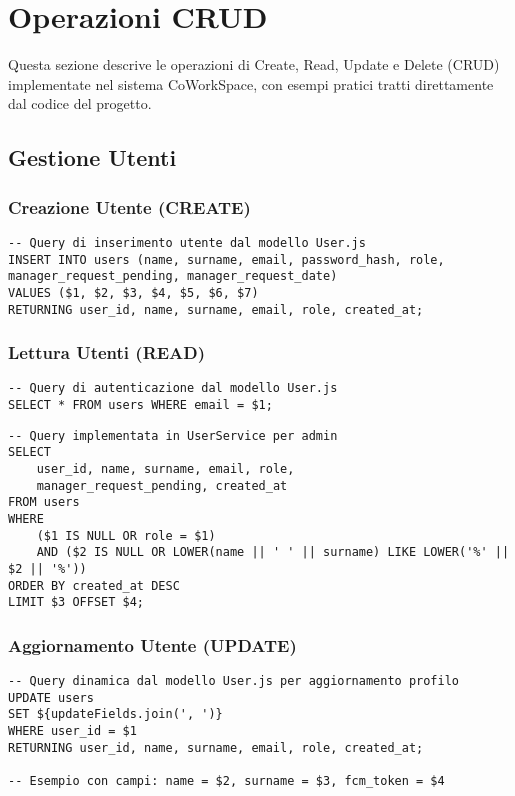 \section{Operazioni CRUD}

Questa sezione descrive le operazioni di Create, Read, Update e Delete (CRUD) implementate nel sistema CoWorkSpace, con esempi pratici tratti direttamente dal codice del progetto.

\subsection{Gestione Utenti}

\subsubsection{Creazione Utente (CREATE)}
\begin{lstlisting}[caption=Registrazione Nuovo Utente (User.js)]
-- Query di inserimento utente dal modello User.js
INSERT INTO users (name, surname, email, password_hash, role, manager_request_pending, manager_request_date)
VALUES ($1, $2, $3, $4, $5, $6, $7)
RETURNING user_id, name, surname, email, role, created_at;
\end{lstlisting}

\subsubsection{Lettura Utenti (READ)}
\begin{lstlisting}[caption=Query per Login Utente]
-- Query di autenticazione dal modello User.js
SELECT * FROM users WHERE email = $1;
\end{lstlisting}

\begin{lstlisting}[caption=Ricerca Utenti con Paginazione]
-- Query implementata in UserService per admin
SELECT 
    user_id, name, surname, email, role, 
    manager_request_pending, created_at
FROM users 
WHERE 
    ($1 IS NULL OR role = $1)
    AND ($2 IS NULL OR LOWER(name || ' ' || surname) LIKE LOWER('%' || $2 || '%'))
ORDER BY created_at DESC
LIMIT $3 OFFSET $4;
\end{lstlisting}

\subsubsection{Aggiornamento Utente (UPDATE)}
\begin{lstlisting}[caption=Aggiornamento Profilo Utente Dinamico]
-- Query dinamica dal modello User.js per aggiornamento profilo
UPDATE users 
SET ${updateFields.join(', ')} 
WHERE user_id = $1 
RETURNING user_id, name, surname, email, role, created_at;

-- Esempio con campi: name = $2, surname = $3, fcm_token = $4
\end{lstlisting}

